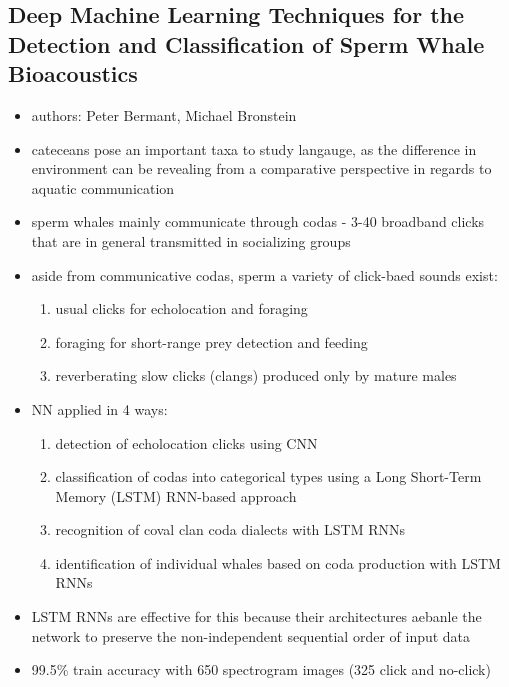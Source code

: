 \documentclass[12pt,a4paper]{article}
\begin{document}
\newpage
\subsection{Deep Machine Learning Techniques for the Detection and Classification of Sperm Whale Bioacoustics} %
\label{sub:deep_machine_learning_techniques_for_the_detection_and_classification_of_sperm_whale_bioacoustics}
\begin{itemize}
  \item authors: Peter Bermant, Michael Bronstein \cite{bermant_deep_2019}
  \item cateceans pose an important taxa to study langauge, as the difference in environment  can be revealing from a comparative perspective in regards to aquatic communication
  \item sperm whales mainly communicate through codas - 3-40 broadband clicks that are in general transmitted in socializing groups
  \item aside from communicative codas, sperm a variety of click-baed sounds exist:
  \begin{enumerate}
    \item usual clicks for echolocation and foraging
    \item foraging for short-range prey detection and feeding
    \item reverberating slow clicks (clangs) produced only by mature males
  \end{enumerate}
  \item NN applied in 4 ways:
  \begin{enumerate}
    \item detection of echolocation clicks using CNN
    \item classification of codas into categorical types using a Long Short-Term Memory (LSTM) RNN-based approach
    \item recognition of coval clan coda dialects with LSTM RNNs
    \item identification of individual whales based on coda production with LSTM RNNs
  \end{enumerate}
  \item LSTM RNNs are effective for this because their architectures aebanle the network to preserve the non-independent sequential order of input data
  \item 99.5\% train accuracy with 650 spectrogram images (325 click and no-click)

\end{itemize}
\end{document}
